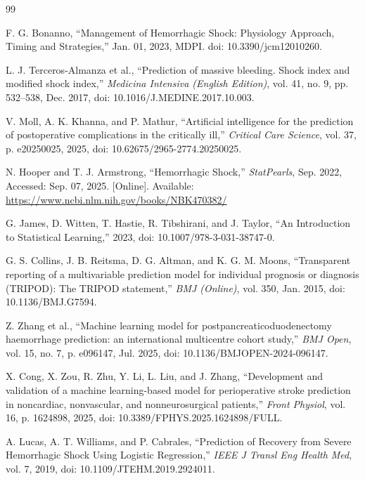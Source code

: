 \begin{thebibliography}{99}

F. G. Bonanno, ``Management of Hemorrhagic Shock: Physiology Approach, Timing and Strategies,'' Jan. 01, 2023, MDPI. doi: 10.3390/jcm12010260.

L. J. Terceros-Almanza et al., ``Prediction of massive bleeding. Shock index and modified shock index,'' \textit{Medicina Intensiva (English Edition)}, vol. 41, no. 9, pp. 532--538, Dec. 2017, doi: 10.1016/J.MEDINE.2017.10.003.

V. Moll, A. K. Khanna, and P. Mathur, ``Artificial intelligence for the prediction of postoperative complications in the critically ill,'' \textit{Critical Care Science}, vol. 37, p. e20250025, 2025, doi: 10.62675/2965-2774.20250025.

N. Hooper and T. J. Armstrong, ``Hemorrhagic Shock,'' \textit{StatPearls}, Sep. 2022, Accessed: Sep. 07, 2025. [Online]. Available: \url{https://www.ncbi.nlm.nih.gov/books/NBK470382/}

G. James, D. Witten, T. Hastie, R. Tibshirani, and J. Taylor, ``An Introduction to Statistical Learning,'' 2023, doi: 10.1007/978-3-031-38747-0.

G. S. Collins, J. B. Reitsma, D. G. Altman, and K. G. M. Moons, ``Transparent reporting of a multivariable prediction model for individual prognosis or diagnosis (TRIPOD): The TRIPOD statement,'' \textit{BMJ (Online)}, vol. 350, Jan. 2015, doi: 10.1136/BMJ.G7594.

Z. Zhang et al., ``Machine learning model for postpancreaticoduodenectomy haemorrhage prediction: an international multicentre cohort study,'' \textit{BMJ Open}, vol. 15, no. 7, p. e096147, Jul. 2025, doi: 10.1136/BMJOPEN-2024-096147.

X. Cong, X. Zou, R. Zhu, Y. Li, L. Liu, and J. Zhang, ``Development and validation of a machine learning-based model for perioperative stroke prediction in noncardiac, nonvascular, and nonneurosurgical patients,'' \textit{Front Physiol}, vol. 16, p. 1624898, 2025, doi: 10.3389/FPHYS.2025.1624898/FULL.

A. Lucas, A. T. Williams, and P. Cabrales, ``Prediction of Recovery from Severe Hemorrhagic Shock Using Logistic Regression,'' \textit{IEEE J Transl Eng Health Med}, vol. 7, 2019, doi: 10.1109/JTEHM.2019.2924011.


\end{thebibliography}
